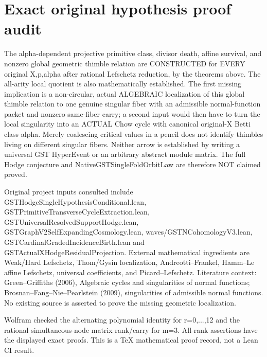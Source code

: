 \documentclass[11pt]{article}
\begin{document}
\section{Exact original hypothesis proof audit}
The alpha-dependent projective primitive class, divisor death, affine survival, and nonzero global geometric thimble relation are CONSTRUCTED for EVERY original X,p,alpha after rational Lefschetz reduction, by the theorems above. The all-arity local quotient is also mathematically established. The first missing implication is a non-circular, actual ALGEBRAIC localization of this global thimble relation to one genuine singular fiber with an admissible normal-function packet and nonzero same-fiber carry; a second input would then have to turn the local singularity into an ACTUAL Chow cycle with canonical original-X Betti class alpha. Merely coalescing critical values in a pencil does not identify thimbles living on different singular fibers. Neither arrow is established by writing a universal GST HyperEvent or an arbitrary abstract module matrix. The full Hodge conjecture and NativeGSTSingleFoldOrbitLaw are therefore NOT claimed proved.

Original project inputs consulted include GSTHodgeSingleHypothesisConditional.lean, GSTPrimitiveTransverseCycleExtraction.lean, GSTUniversalResolvedSupportHodge.lean, GSTGraphV2SelfExpandingCosmology.lean, waves/GSTNCohomologyV3.lean, GSTCardinalGradedIncidenceBirth.lean and GSTActualXHodgeResidualProjection. External mathematical ingredients are Weak/Hard Lefschetz, Thom/Gysin localization, Andreotti--Frankel, Hamm--Le affine Lefschetz, universal coefficients, and Picard--Lefschetz. Literature context: Green--Griffiths (2006), Algebraic cycles and singularities of normal functions; Brosnan--Fang--Nie--Pearlstein (2009), singularities of admissible normal functions. No existing source is asserted to prove the missing geometric localization.

Wolfram checked the alternating polynomial identity for r=0,...,12 and the rational simultaneous-node matrix rank/carry for m=3. All-rank assertions have the displayed exact proofs. This is a TeX mathematical proof record, not a Lean CI result.
\end{document}
